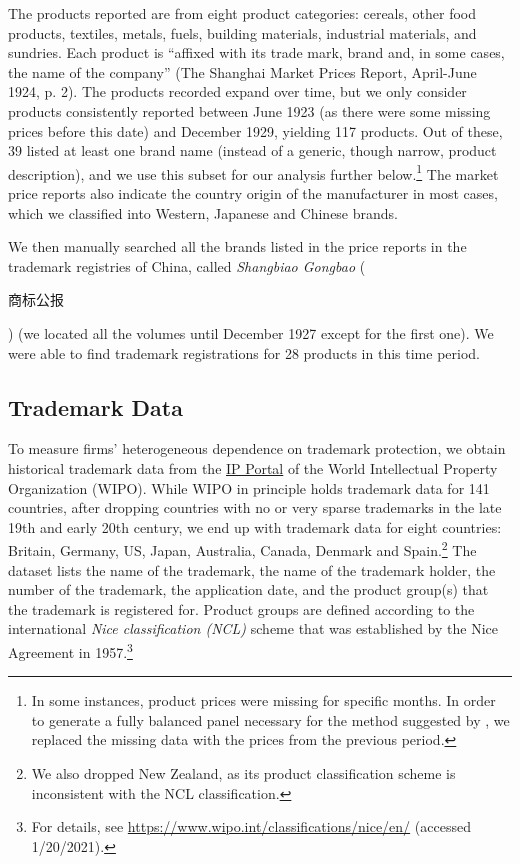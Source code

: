 \documentclass[12pt]{article}
\begin{document}
The products reported are from eight product categories: cereals, other food products, textiles, metals, fuels, building materials, industrial materials, and sundries. Each product is ``affixed with its trade mark, brand and, in some cases, the name of the company'' (The Shanghai Market Prices Report, April-June 1924, p. 2). The products recorded expand over time, but we only consider products consistently reported between June 1923 (as there were some missing prices before this date) and December 1929, yielding 117 products. Out of these, 39 listed at least one brand name (instead of a generic, though narrow, product description), and we use this subset for our analysis further below.\footnote{In some instances, product prices were missing for specific months. In order to generate a fully balanced panel necessary for the method suggested by \citet{CallawaySantAnna2020}, we replaced the missing data with the prices from the previous period. } The market price reports also indicate the country origin of the manufacturer in most cases, which we classified into Western, Japanese and Chinese brands. 

We then manually searched all the brands listed in the price reports in the trademark registries of China, called \emph{Shangbiao Gongbao} (\begin{CJK*}{UTF8}{gbsn}商标公报\end{CJK*})  (we located all the volumes until December 1927 except for the first one). We were able to find trademark registrations for 28 products in this time period.%

\subsection{Trademark Data}

To measure firms' heterogeneous dependence on trademark protection, we obtain historical trademark data from the \href{https://www3.wipo.int/branddb/en/}{IP Portal} of the World Intellectual Property Organization (WIPO). While WIPO in principle  holds  trademark data for 141 countries, after dropping countries with no or very sparse trademarks in the late 19th and early 20th century, we end up with trademark data for eight countries:  Britain, Germany, US, Japan, Australia, Canada, Denmark and Spain.\footnote{We also dropped New Zealand, as its product classification scheme is inconsistent with the NCL classification.} The dataset lists the name of the trademark, the name of the trademark holder, the number of the trademark, the application date, and the product group(s) that the trademark is registered for.  Product groups are defined according to the international \emph{Nice classification (NCL)} scheme that was established by the Nice Agreement in 1957.\footnote{For details, see \url{https://www.wipo.int/classifications/nice/en/} (accessed 1/20/2021).} 
\end{document}
